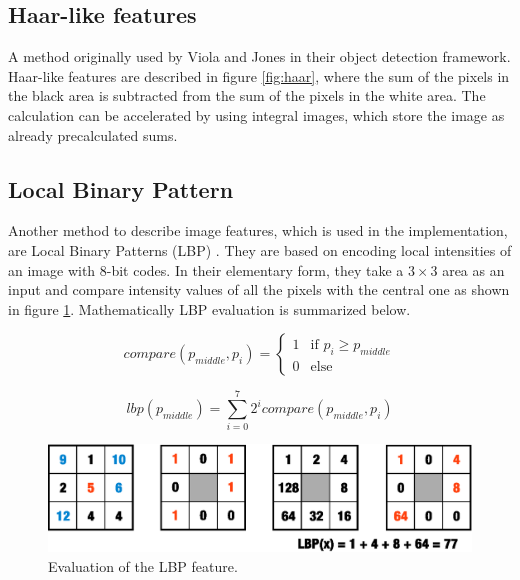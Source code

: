 \subsection{Haar-like features}

A method originally used by Viola and Jones \cite{Viola01rapidobject} in their object detection framework. Haar-like features are described in figure \ref{fig:haar}, where the sum of the pixels in the black area is subtracted from the sum of the pixels in the white area. The calculation can be accelerated by using integral images, which store the image as already precalculated sums.

\subsection{Local Binary Pattern}

Another method to describe image features, which is used in the implementation, are Local Binary Patterns (LBP) \cite{Ojala02multiresolutiongrayscale}. They are based on encoding local intensities of an image with 8-bit codes. In their elementary form, they take a $3 \times 3$ area as an input and compare intensity values of all the pixels with the central one as shown in figure \ref{fig:lbp}. Mathematically LBP evaluation is summarized below.

\begin{equation}
 compare(p_{middle},p_{i}) =
  \begin{cases}
   1 & \text{if } p_{i} \geq p_{middle} \\
   0 & \text{else}
  \end{cases}
\end{equation}

\begin{equation}
lbp(p_{middle})=\sum_{i=0}^{7} 2^{i}
compare(p_{middle},p_{i})
\end{equation}

\begin{center}
\begin{figure}[ht]
	\centering\includegraphics[width=12cm]{fig/lbp.eps}
	\caption{Evaluation of the LBP feature.}
	\label{fig:lbp}
\end{figure}
\end{center}

